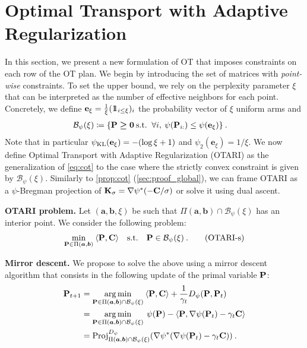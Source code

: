 

\section{Optimal Transport with Adaptive Regularization}\label{sec:pwot}

In this section, we present a new formulation of OT that imposes constraints on each row of the OT plan.
We begin by introducing the set of matrices with \emph{point-wise} constraints. To set the upper bound, we rely on the perplexity parameter $\xi$ \cite{van2023snekhorn} that can be interpreted as the number of effective neighbors for each point. Concretely, we define $\mathbf{e}_{\xi} = \frac{1}{\xi}(1\!\!1_{i \leq \xi})_{i}$ the probability vector of $\xi$ uniform arms and
\begin{align}
  \mathcal{B}_\psi(\xi) &\coloneqq \{{\mathbf{P}} \bm{\geq} \bm{0} \: \text{s.t.}\ \: \forall i, \: \psi({\mathbf{P}}_{i:}) \leq \psi(\mathbf{e}_{\xi}) \} \:.
\end{align}
Note that in particular $\psi_{\operatorname{KL}}(\mathbf{e}_{\xi}) = - (\log \xi + 1)$ and $\psi_2(\mathbf{e}_{\xi}) = 1/\xi$.
We now define Optimal Transport with Adaptive Regularization (OTARI) as the generalization of \eqref{eq:cot} to the case where the strictly convex constraint is given by $\mathcal{B}_\psi(\xi)$. Similarly to \cref{prop:cot} (\cref{sec:proof_global}), we can frame OTARI as a $\psi$-Bregman projection of ${\mathbf{K}}_\sigma = \nabla \psi^*(-{\mathbf{C}} / \sigma)$ or solve it using dual ascent.

\textbf{OTARI problem.}
  Let $(\bm{a}, \bm{b}, \xi)$ be such that $\Pi(\bm{a}, \bm{b}) \cap \mathcal{B}_\psi(\xi)$ has an interior point.
  We consider the following problem:
  \begin{align}\label{eq:pcOT}
    \min_{{\mathbf{P}} \in \Pi(\bm{a}, \bm{b})} \: \langle {\mathbf{P}}, {\mathbf{C}} \rangle \quad \text{s.t.} \quad  {\mathbf{P}} \in \mathcal{B}_\psi(\xi) \:.
    \tag{OTARI-s}
\end{align}

\textbf{Mirror descent.}
We propose to solve the above using a mirror descent algorithm that consists in the following update of the primal variable ${\mathbf{P}}$:
\begin{align}
  {\mathbf{P}}_{t+1} &= \operatorname*{arg\,min}_{{\mathbf{P}} \in \Pi(\bm{a}, \bm{b}) \cap \mathcal{B}_\psi(\xi)} \: \langle {\mathbf{P}} , {\mathbf{C}} \rangle + \frac{1}{\gamma_t} D_{\psi}({\mathbf{P}}, {\mathbf{P}}_t) \\
  &= \operatorname*{arg\,min}_{{\mathbf{P}} \in \Pi(\bm{a}, \bm{b}) \cap \mathcal{B}_\psi(\xi)} \: \psi({\mathbf{P}}) - \langle {\mathbf{P}} , \nabla \psi({\mathbf{P}}_t) - \gamma_t {\mathbf{C}} \rangle \\
  &= \operatorname{Proj}^{D_\psi}_{\Pi(\bm{a}, \bm{b}) \cap \mathcal{B}_\psi(\xi)}(\nabla \psi^*(\nabla \psi({\mathbf{P}}_t) - \gamma_t {\mathbf{C}})) \:.
\end{align}

